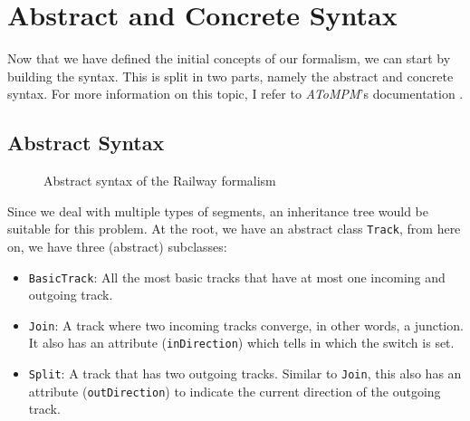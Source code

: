 \documentclass{article}
\begin{document}
\section{Abstract and Concrete Syntax}

Now that we have defined the initial concepts of our formalism, we can start by building the syntax. This is split in two parts, namely the abstract and concrete syntax. For more information on this topic, I refer to \textit{AToMPM}'s documentation \cite{atompm_docs}.

\subsection{Abstract Syntax}

\begin{figure}[H]
    \begin{center}
    \end{center}
    \caption{Abstract syntax of the Railway formalism}
    \label{abstract_syntax}
\end{figure}


Since we deal with multiple types of segments, an inheritance tree would be suitable for this problem. At the root, we have an abstract class \texttt{Track}, from here on, we have three (abstract) subclasses:

\begin{itemize}
    \item \texttt{BasicTrack}: All the most basic tracks that have at most one incoming and outgoing track.
    \item \texttt{Join}: A track where two incoming tracks converge, in other words, a junction. It also has an attribute (\texttt{inDirection}) which tells in which the switch is set.
    \item \texttt{Split}: A track that has two outgoing tracks. Similar to \texttt{Join}, this also has an attribute (\texttt{outDirection}) to indicate the current direction of the outgoing track.
\end{itemize}
\end{document}
